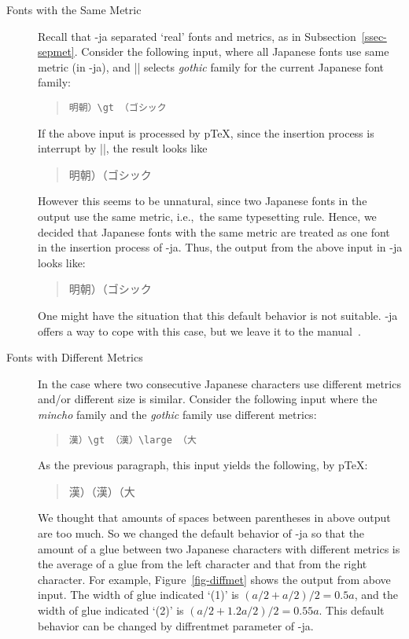 \documentclass{ajt}
\begin{document}
\begin{description}
\item[Fonts with the Same Metric]
Recall that \LuaTeX-ja separated `real' fonts and metrics, as in Subsection~\ref{ssec-sepmet}. 
Consider the following input, where all Japanese fonts use same metric
	   (in \LuaTeX-ja), and |\gt| selects \emph{gothic} family for
	   the current Japanese font family:
\begin{quote}
\begin{verbatim}
明朝）\gt （ゴシック
\end{verbatim}
\end{quote}
If the above input is processed by p\TeX, since the insertion process is
	   interrupt by |\gt|, the result looks like
\begin{quote}
\mc 明朝）\hbox{}\gt （ゴシック
\end{quote}
However this seems to be unnatural, since two Japanese fonts in the
	   output use the same metric, i.e.,~the same
	   typesetting rule.  Hence, we decided that Japanese fonts with
	   the same metric are treated as one font in the insertion
	   process of \LuaTeX-ja. Thus, the output from the above input
	   in \LuaTeX-ja looks like:
\begin{quote}
\mc 明朝）\gt （ゴシック
\end{quote}
One might have the situation that this default behavior is not
	   suitable. \LuaTeX-ja offers a way to cope with this case, but
	   we leave it to the manual~\cite{man}.

\item[Fonts with Different Metrics] 
In the case where two consecutive Japanese characters use different metrics and/or
	   different size is similar. Consider the following input where
	   the \emph{mincho} family and the \emph{gothic} family use
	   different metrics:
\begin{quote}
\begin{verbatim}
漢）\gt （漢）\large （大
\end{verbatim}
\end{quote}
As the previous paragraph, this input yields the following, by p\TeX:
\begin{quote}
\mc 漢）\hbox{}\gt （漢）\hbox{}\large （大
\end{quote}
We thought that amounts of spaces between parentheses in above output
	   are too much. So we changed the default behavior of
	   \LuaTeX-ja so that the amount of a glue between two Japanese
	   characters with different metrics is the average of a glue
	   from the left character and that from the right
	   character. For example, Figure~\ref{fig-diffmet} shows the
	   output from above input. The width of glue indicated `(1)' is
	   $(a/2 + a/2)/2 = 0.5a$, and the width of glue indicated `(2)'
	   is $(a/2 + 1.2a/2)/2 = 0.55a$. This default behavior can be
	   changed by \textsf{diffrentmet} parameter of \LuaTeX-ja.


\end{description}
\end{document}
